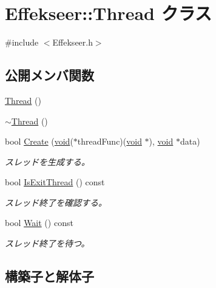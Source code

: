 \hypertarget{class_effekseer_1_1_thread}{}\section{Effekseer\+:\+:Thread クラス}
\label{class_effekseer_1_1_thread}


{\ttfamily \#include $<$Effekseer.\+h$>$}

\subsection*{公開メンバ関数}
\begin{DoxyCompactItemize}
\item 
\mbox{\hyperlink{class_effekseer_1_1_thread_ad8b87cc1bfc2bf7f2d851f69d60d39c8}{Thread}} ()
\item 
\mbox{\hyperlink{class_effekseer_1_1_thread_a5e081a4312fd66ffd9e26aea3b177297}{$\sim$\+Thread}} ()
\item 
bool \mbox{\hyperlink{class_effekseer_1_1_thread_af30613ba2b4e0f929fb70e71f820b394}{Create}} (\mbox{\hyperlink{namespace_effekseer_ab34c4088e512200cf4c2716f168deb56}{void}}($\ast$thread\+Func)(\mbox{\hyperlink{namespace_effekseer_ab34c4088e512200cf4c2716f168deb56}{void}} $\ast$), \mbox{\hyperlink{namespace_effekseer_ab34c4088e512200cf4c2716f168deb56}{void}} $\ast$data)
\begin{DoxyCompactList}\small\item\em スレッドを生成する。 \end{DoxyCompactList}\item 
bool \mbox{\hyperlink{class_effekseer_1_1_thread_a0fb87aa53d905bfadd1c0df29877b97d}{Is\+Exit\+Thread}} () const
\begin{DoxyCompactList}\small\item\em スレッド終了を確認する。 \end{DoxyCompactList}\item 
bool \mbox{\hyperlink{class_effekseer_1_1_thread_a1a5806df4d7bdd6dc0a0e25986f75d78}{Wait}} () const
\begin{DoxyCompactList}\small\item\em スレッド終了を待つ。 \end{DoxyCompactList}\end{DoxyCompactItemize}


\subsection{構築子と解体子}
\mbox{\label{class_effekseer_1_1_thread_ad8b87cc1bfc2bf7f2d851f69d60d39c8}} 
